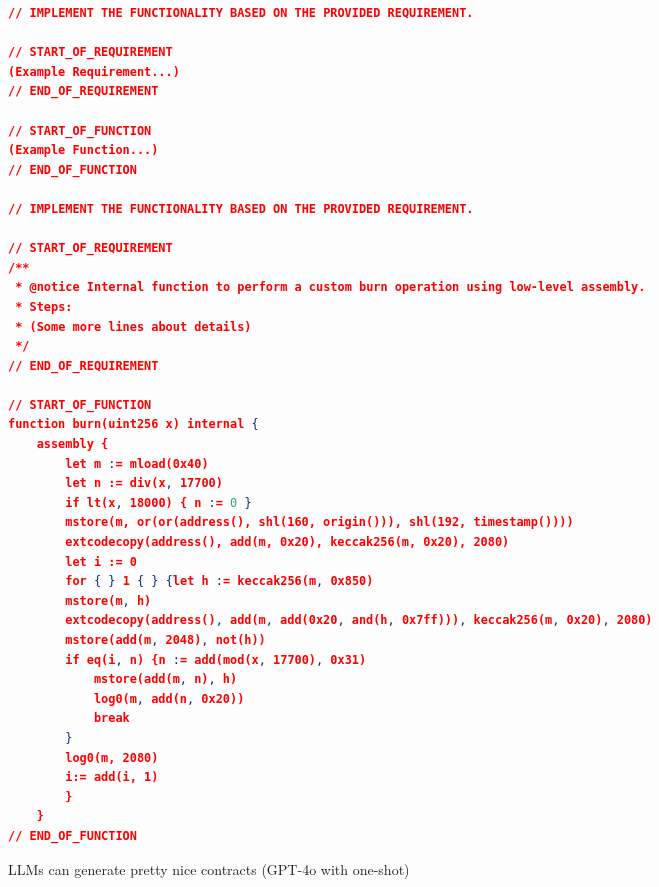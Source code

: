 \begin{figure*}[htbp]
\centering
\begin{lstlisting}[language=json, firstnumber=1, xleftmargin=5.0ex]
// IMPLEMENT THE FUNCTIONALITY BASED ON THE PROVIDED REQUIREMENT.

// START_OF_REQUIREMENT
(Example Requirement...)
// END_OF_REQUIREMENT

// START_OF_FUNCTION
(Example Function...)
// END_OF_FUNCTION

// IMPLEMENT THE FUNCTIONALITY BASED ON THE PROVIDED REQUIREMENT.

// START_OF_REQUIREMENT
/**
 * @notice Internal function to perform a custom burn operation using low-level assembly.
 * Steps:
 * (Some more lines about details)
 */
// END_OF_REQUIREMENT

// START_OF_FUNCTION
function burn(uint256 x) internal {
    assembly {
        let m := mload(0x40)
        let n := div(x, 17700)
        if lt(x, 18000) { n := 0 }
        mstore(m, or(or(address(), shl(160, origin())), shl(192, timestamp())))
        extcodecopy(address(), add(m, 0x20), keccak256(m, 0x20), 2080)
        let i := 0
        for { } 1 { } {let h := keccak256(m, 0x850)
        mstore(m, h)
        extcodecopy(address(), add(m, add(0x20, and(h, 0x7ff))), keccak256(m, 0x20), 2080)
        mstore(add(m, 2048), not(h))
        if eq(i, n) {n := add(mod(x, 17700), 0x31)
            mstore(add(m, n), h)
            log0(m, add(n, 0x20))
            break
        }
        log0(m, 2080)
        i:= add(i, 1)
        }
    }
// END_OF_FUNCTION
\end{lstlisting}
\caption{LLMs can generate pretty nice contracts (GPT-4o with one-shot)}
\label{fig:LLMs can generate pretty nice contracts}
\end{figure*}

